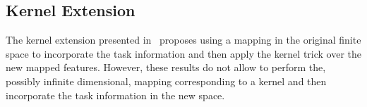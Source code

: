 \subsection{Kernel Extension}

The kernel extension presented in~\cite{EvgeniouMP05} proposes using a mapping in the original finite space to incorporate the task information and then apply the kernel trick over the new mapped features. However, these results do not allow to perform the, possibly infinite dimensional, mapping corresponding to a kernel and then incorporate the task information in the new space.

